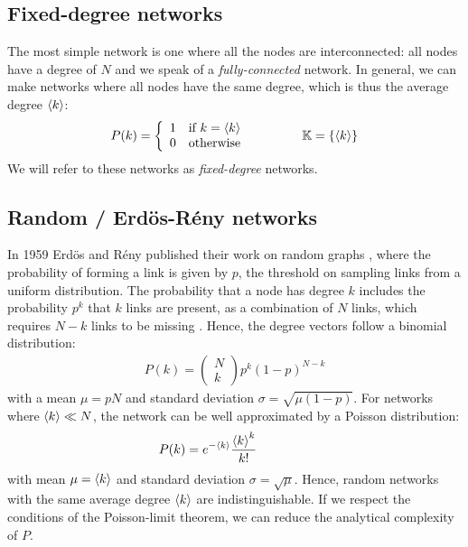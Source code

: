 \subsection{Fixed-degree networks}
The most simple network is one where all the nodes are interconnected: all nodes have a degree of $N$ and we speak of a \textsl{fully-connected} network. In general, we can make networks where all nodes have the same degree, which is thus the average degree ${\langle k\rangle}$:
\begin{align}
P(k) = \left\{\begin{array}{ll}1 & \text{if } k=\kmean \\0 & \text{otherwise}\end{array}\right. \hspace{15mm} \K = \{ \kmean \} \label{eq:diracpdf}
\end{align}
We will refer to these networks as \textsl{fixed-degree} networks. 


\subsection{Random / Erd{\"o}s-R{\'e}ny networks}
In 1959 Erd{\"o}s and R{\'e}ny published their work on random graphs \cite{RandomGraphs1959}, where the probability of forming a link is given by $p$, the threshold on sampling links from a uniform distribution. The probability that a node has degree $k$ includes the probability $p^k$ that $k$ links are present, as a combination of $N$ links, which requires $N-k$ links to be missing \cite{BarabasiNetworkBook2016}. Hence, the degree vectors follow a binomial distribution:
\begin{align}
P(k)=\left(\begin{array}{c}N \\ k\end{array}\right) p^{k}(1-p)^{N-k} \label{eq:binomialpdf}
\end{align}
with a mean $\mu = pN$ and standard deviation $\sigma = \sqrt{\mu(1-p)}$. For networks where ${\langle k\rangle} \ll N$, the network can be well approximated by a Poisson distribution:
\begin{align}
P(k) = e^{-\kmean} \frac{\kmean^{k}}{k !} \hspace{15mm} \label{eq:poissonpdf}
\end{align}
with mean $\mu = {\langle k\rangle}$ and standard deviation $\sigma = \sqrt{\mu}$. Hence, random networks with the same average degree ${\langle k\rangle}$ are indistinguishable. If we respect the conditions of the Poisson-limit theorem, we can reduce the analytical complexity of $P$. 

